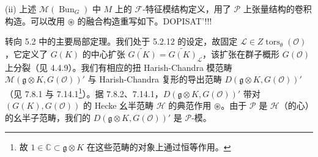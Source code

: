 (ii) 上述 $\mathcal{M}(\operatorname{Bun}_G)$ 中 $M$ 上的 $\mathcal{F}$-特征模结构定义，用了 $\mathcal{P}$ 上张量结构的卷积构造。可以改用 $\circledast$ 的融合构造重写如下。DOPISAT'!!!

 转向 5.2 中的主要局部定理。我们处于 5.2.12 的设定，故固定 $\mathcal{L}\in Z\operatorname{tors}_{\theta}(\mathcal{O})$，它定义了 $G(K)$ 的中心扩张 $\widetilde{G(K)}=\widetilde{G(K)}_{\mathcal{L}}$，该扩张在群子概形 $G(\mathcal{O})$ 上分裂（见 4.4.9）。我们有相应的扭 Harish-Chandra 模范畴 $\mathcal{M}(\mathfrak{g}\otimes K,G(\mathcal{O}))'$ 与 Harish-Chandra 复形的导出范畴 $D(\mathfrak{g}\otimes K,G(\mathcal{O}))'$（见 7.8.1 与 7.14.1\footnote{故 $1\in\mathbb{C}\subset\mathfrak{g}\otimes K$ 在这些范畴的对象上通过恒等作用。}）。据 7.8.2、7.14.1，$D(\mathfrak{g}\otimes K,G(\mathcal{O}))'$ 带对 $(G(K),G(\mathcal{O}))$ 的 Hecke 幺半范畴 $\mathcal{H}$ 的典范作用 $\circledast$。由于 $\mathcal{P}$ 是 $\mathcal{H}$（的心）的幺半子范畴，我们的 $D(\mathfrak{g}\otimes K,G(\mathcal{O}))'$ 是 $\mathcal{P}$-模。
